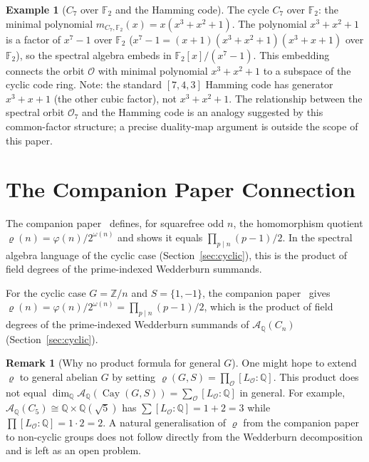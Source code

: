 \documentclass[12pt]{amsart}
\numberwithin{equation}{section}
\theoremstyle{plain}
\theoremstyle{definition}
\newtheorem{example}[theorem]{Example}
\newtheorem{remark}[theorem]{Remark}
\DeclareMathOperator{\Cay}{Cay}
\newcommand{\Z}{\mathbb{Z}}
\newcommand{\Q}{\mathbb{Q}}
\newcommand{\F}{\mathbb{F}}
\newcommand{\calA}{\mathcal{A}}
\newcommand{\calO}{\mathcal{O}}
\begin{document}
\begin{example}[$C_7$ over $\F_2$ and the Hamming code]
The cycle $C_7$ over $\F_2$: the minimal polynomial $m_{C_7,\F_2}(x)
= x(x^3+x^2+1)$.  The polynomial $x^3+x^2+1$ is a factor of $x^7-1$
over $\F_2$ ($x^7-1 = (x+1)(x^3+x^2+1)(x^3+x+1)$ over $\F_2$), so the
spectral algebra embeds in $\F_2[x]/(x^7-1)$.  This embedding connects the
orbit $\calO$ with minimal polynomial $x^3+x^2+1$ to a subspace of the
cyclic code ring.  Note: the standard $[7,4,3]$ Hamming code has generator
$x^3+x+1$ (the other cubic factor), not $x^3+x^2+1$.  The relationship
between the spectral orbit $\calO_7$ and the Hamming code is an analogy
suggested by this common-factor structure; a precise duality-map argument
is outside the scope of this paper.
\end{example}

\section{The Companion Paper Connection}
\label{sec:companion}

The companion paper~\cite{MKB26} defines, for squarefree odd $n$, the
homomorphism quotient $\varrho(n) = \varphi(n)/2^{\omega(n)}$ and shows it
equals $\prod_{p \mid n}(p-1)/2$.  In the spectral algebra language
of the cyclic case (Section~\ref{sec:cyclic}), this is the product of
field degrees of the prime-indexed Wedderburn summands.

For the cyclic case $G = \Z/n$ and $S = \{1,-1\}$, the companion
paper~\cite{MKB26} gives $\varrho(n) = \varphi(n)/2^{\omega(n)}
= \prod_{p \mid n}(p-1)/2$, which is the product of field degrees of the
prime-indexed Wedderburn summands of $\calA_\Q(C_n)$ (Section~\ref{sec:cyclic}).

\begin{remark}[Why no product formula for general $G$]
One might hope to extend $\varrho$ to general abelian $G$ by setting
$\varrho(G,S) = \prod_\calO [L_\calO:\Q]$.  This product does not equal
$\dim_\Q \calA_\Q(\Cay(G,S)) = \sum_\calO [L_\calO:\Q]$ in general.
For example, $\calA_\Q(C_5) \cong \Q \times \Q(\sqrt{5})$ has
$\sum [L_\calO:\Q] = 1+2 = 3$ while $\prod [L_\calO:\Q] = 1 \cdot 2 = 2$.
A natural generalisation of $\varrho$ from the companion paper to
non-cyclic groups does not follow directly from the Wedderburn decomposition
and is left as an open problem.
\end{remark}
\end{document}
